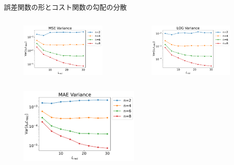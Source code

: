 \documentclass[dvipdfmx,10pt,aspectratio=169]{beamer}
\begin{document}
\begin{frame}{誤差関数の形とコスト関数の勾配の分散}
    \vspace{-10pt}
    \begin{columns}
        \begin{column}{0.5\textwidth}
            \begin{figure}
                \centering\includegraphics[width=6cm]{variance-mse_encoding3.pdf}
            \end{figure}
        \end{column}
        \begin{column}{0.5\textwidth}
            \begin{figure}
                \centering\includegraphics[width=6cm]{variance-log_encoding3.pdf}
            \end{figure}
        \end{column}
    \end{columns}
    \vspace{-15pt}
    \begin{figure}
        \centering\includegraphics[width=6cm]{variance-mae_encoding3.pdf}
    \end{figure}
\end{frame}
\end{document}
